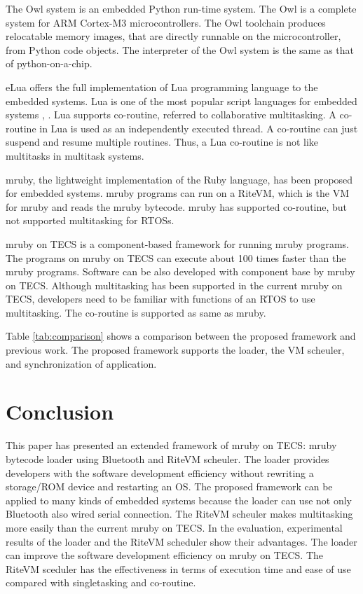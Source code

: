 \documentclass[conference,compsoc]{IEEEtran}
\begin{document}
The Owl system is an embedded Python run-time system.
The Owl is a complete system for ARM Cortex-M3 microcontrollers.
The Owl toolchain produces relocatable memory images, that are directly runnable on the microcontroller, from Python code objects.
The interpreter of the Owl system is the same as that of python-on-a-chip.

eLua offers the full implementation of Lua programming language to the embedded systems.
Lua is one of the most popular script languages for embedded systems \cite{url:Lua}, \cite{par:Lua}.
Lua supports co-routine, referred to collaborative multitasking.
A co-routine in Lua is used as an independently executed thread.
A co-routine can just suspend and resume multiple routines.
Thus, a Lua co-routine is not like multitasks in multitask systems.

mruby, the lightweight implementation of the Ruby language, has been proposed for embedded systems.
mruby programs can run on a RiteVM, which is the VM for mruby and reads the mruby bytecode.
mruby has supported co-routine, but not supported multitasking for RTOSs.

mruby on TECS is a component-based framework for running mruby programs.
The programs on mruby on TECS can execute about 100 times faster than the mruby programs.
Software can be also developed with component base by mruby on TECS.
Although multitasking has been supported in the current mruby on TECS, developers need to be familiar with functions of an RTOS to use multitasking.
The co-routine is supported as same as mruby.

Table \ref{tab:comparison} shows a comparison between the proposed framework and previous work.
The proposed framework supports the loader, the VM scheuler, and synchronization of application.

\section{Conclusion}
\label{sec:Conclusion}
This paper has presented an extended framework of mruby on TECS: mruby bytecode loader using Bluetooth and RiteVM scheuler.
The loader provides developers with the software development efficiency without rewriting a storage/ROM device and restarting an OS.
The proposed framework can be applied to many kinds of embedded systems  because the loader can use not only Bluetooth also wired serial connection.
The RiteVM scheuler makes multitasking more easily than the current mruby on TECS.
In the evaluation, experimental results of the loader and the RiteVM scheduler show their advantages.
The loader can improve the software development efficiency on mruby on TECS.
The RiteVM sceduler has the effectiveness in terms of execution time and ease of use compared with singletasking and co-routine.
\end{document}
